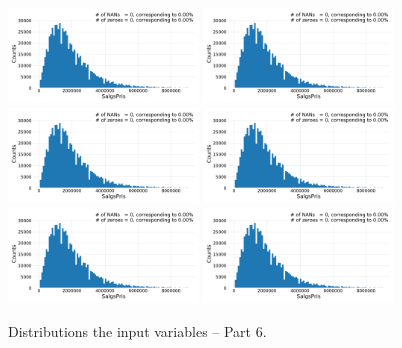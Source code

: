 \begin{figure}
  \subfloat{\qquad}
  \includegraphics[draft=false, width=0.45\textwidth, page=67, trim=15 0 15 0, clip]{figures/housing/overview_fig.pdf}\hfil
  \subfloat{\qquad}
  \includegraphics[draft=false, width=0.45\textwidth, page=68, trim=15 0 15 0, clip]{figures/housing/overview_fig.pdf}
  \subfloat{\qquad}
  \includegraphics[draft=false, width=0.45\textwidth, page=69, trim=15 0 15 0, clip]{figures/housing/overview_fig.pdf}\hfil
  \subfloat{\qquad}
  \includegraphics[draft=false, width=0.45\textwidth, page=70, trim=15 0 15 0, clip]{figures/housing/overview_fig.pdf}
  \subfloat{\qquad}
  \includegraphics[draft=false, width=0.45\textwidth, page=71, trim=15 0 15 0, clip]{figures/housing/overview_fig.pdf}\hfil
  \subfloat{\qquad}
  \includegraphics[draft=false, width=0.45\textwidth, page=72, trim=15 0 15 0, clip]{figures/housing/overview_fig.pdf}
  \caption[Distributions of the Input Variables -- Part 6]{Distributions the input variables -- Part 6.}
  \label{fig:h:variable_overview_all_6}
  \vspace{\abovecaptionskip}
\end{figure}

